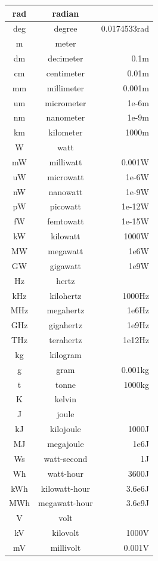 \begin{longtable}{|c|c|r|}
  rad & radian & \\\hline
  deg & degree & 0.0174533rad \\\hline
  m & meter & \\\hline
  dm & decimeter & 0.1m \\\hline
  cm & centimeter & 0.01m \\\hline
  mm & millimeter & 0.001m \\\hline
  um & micrometer & 1e-6m \\\hline
  nm & nanometer & 1e-9m \\\hline
  km & kilometer & 1000m \\\hline
  W & watt & \\\hline
  mW & milliwatt & 0.001W \\\hline
  uW & microwatt & 1e-6W \\\hline
  nW & nanowatt & 1e-9W \\\hline
  pW & picowatt & 1e-12W \\\hline
  fW & femtowatt & 1e-15W \\\hline
  kW & kilowatt & 1000W \\\hline
  MW & megawatt & 1e6W \\\hline
  GW & gigawatt & 1e9W \\\hline
  Hz & hertz & \\\hline
  kHz & kilohertz & 1000Hz \\\hline
  MHz & megahertz & 1e6Hz \\\hline
  GHz & gigahertz & 1e9Hz \\\hline
  THz & terahertz & 1e12Hz \\\hline
  kg & kilogram & \\\hline
  g & gram & 0.001kg \\\hline
  t & tonne & 1000kg \\\hline
  K & kelvin & \\\hline
  J & joule & \\\hline
  kJ & kilojoule & 1000J \\\hline
  MJ & megajoule & 1e6J \\\hline
  Ws & watt-second & 1J \\\hline
  Wh & watt-hour & 3600J \\\hline
  kWh & kilowatt-hour & 3.6e6J \\\hline
  MWh & megawatt-hour & 3.6e9J \\\hline
  V & volt & \\\hline
  kV & kilovolt & 1000V \\\hline
  mV & millivolt & 0.001V \\\hline

\end{longtable}
